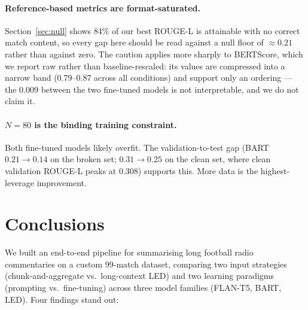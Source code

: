 \documentclass[10pt,a4paper]{article}
\begin{document}
\paragraph{Reference-based metrics are format-saturated.} Section~\ref{sec:null} shows 84\% of our best ROUGE-L is attainable with no correct match content, so every gap here should be read against a null floor of $\approx 0.21$ rather than against zero. The caution applies more sharply to BERTScore, which we report raw rather than baseline-rescaled: its values are compressed into a narrow band (0.79--0.87 across all conditions) and support only an ordering --- the 0.009 between the two fine-tuned models is not interpretable, and we do not claim it.

\paragraph{$N = 80$ is the binding training constraint.} Both fine-tuned models likely overfit. The validation-to-test gap (BART $0.21 \to 0.14$ on the broken set; $0.31 \to 0.25$ on the clean set, where clean validation ROUGE-L peaks at 0.308) supports this. More data is the highest-leverage improvement.

\section{Conclusions}

We built an end-to-end pipeline for summarising long football radio commentaries on a custom 99-match dataset, comparing two input strategies (chunk-and-aggregate vs.\ long-context LED) and two learning paradigms (prompting vs.\ fine-tuning) across three model families (FLAN-T5, BART, LED). Four findings stand out:
\end{document}
